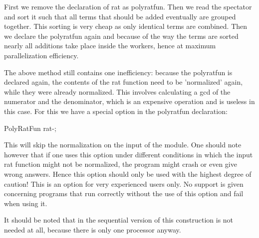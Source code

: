 \noindent
First we remove the declaration of rat as polyratfun. Then we read the 
spectator and sort it such that all terms that should be added eventually 
are grouped together. This sorting is very cheap as only identical terms 
are combined. Then we declare the polyratfun again and because of the way 
the terms are sorted nearly all additions take place inside the workers, 
hence at maximum parallelization efficiency.

\noindent
The above method still contains one inefficiency: because the polyratfun is 
declared again, the contents of the rat function need to be 'normalized' 
again, while they were already normalized. This involves calculating a gcd 
of the numerator and the denominator, which is an expensive operation 
and is useless in this case. For this we have a special option in the 
polyratfun declaration:

\begin{minipage}{10cm}
   PolyRatFun rat-;
\end{minipage}

\noindent
This will skip the normalization on the input of the module. One should 
note however that if one uses this option under different conditions in 
which the input rat function might not be normalized, the program might 
crash or even give wrong answers. Hence this option should only be used 
with the highest degree of caution! This is an option for very experienced 
users only. No support is given concerning programs that run correctly 
without the use of this option and fail when using it.

\noindent
It should be noted that in the sequential version of \FORM{} this 
construction is not needed at all, because there is only one processor 
anyway.

